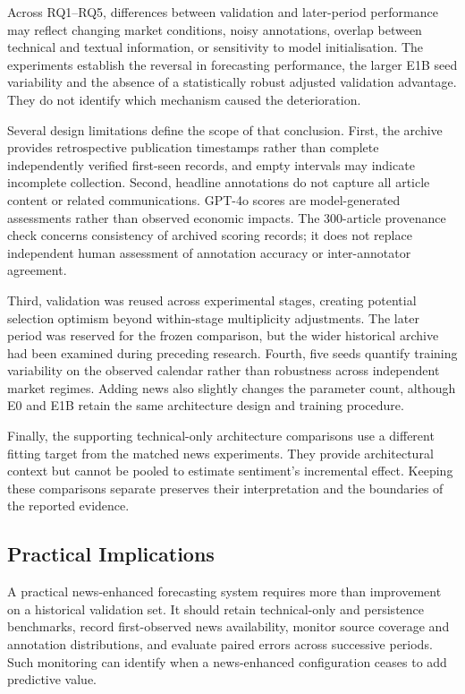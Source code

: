 Across RQ1--RQ5, differences between validation and later-period performance may reflect changing market conditions, noisy annotations, overlap between technical and textual information, or sensitivity to model initialisation. The experiments establish the reversal in forecasting performance, the larger E1B seed variability and the absence of a statistically robust adjusted validation advantage. They do not identify which mechanism caused the deterioration.

Several design limitations define the scope of that conclusion. First, the archive provides retrospective publication timestamps rather than complete independently verified first-seen records, and empty intervals may indicate incomplete collection. Second, headline annotations do not capture all article content or related communications. GPT-4o scores are model-generated assessments rather than observed economic impacts. The 300-article provenance check concerns consistency of archived scoring records; it does not replace independent human assessment of annotation accuracy or inter-annotator agreement.

Third, validation was reused across experimental stages, creating potential selection optimism beyond within-stage multiplicity adjustments. The later period was reserved for the frozen comparison, but the wider historical archive had been examined during preceding research. Fourth, five seeds quantify training variability on the observed calendar rather than robustness across independent market regimes. Adding news also slightly changes the parameter count, although E0 and E1B retain the same architecture design and training procedure.

Finally, the supporting technical-only architecture comparisons use a different fitting target from the matched news experiments. They provide architectural context but cannot be pooled to estimate sentiment's incremental effect. Keeping these comparisons separate preserves their interpretation and the boundaries of the reported evidence.

\subsection{Practical Implications}
\label{subsec:discussion-implications}

A practical news-enhanced forecasting system requires more than improvement on a historical validation set. It should retain technical-only and persistence benchmarks, record first-observed news availability, monitor source coverage and annotation distributions, and evaluate paired errors across successive periods. Such monitoring can identify when a news-enhanced configuration ceases to add predictive value.

